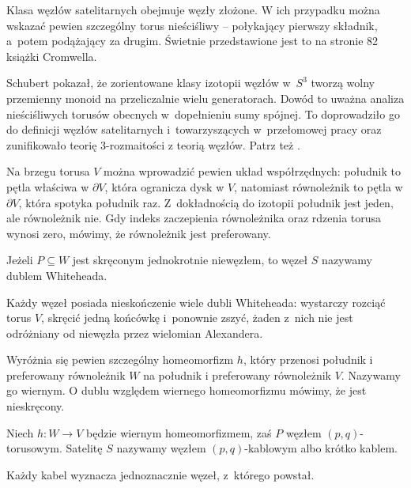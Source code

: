 \begin{example}
	Klasa węzłów satelitarnych obejmuje węzły złożone.
	W ich przypadku można wskazać pewien szczególny torus nieściśliwy -- połykający pierwszy składnik, a~potem podążający za drugim.
	Świetnie przedstawione jest to na stronie 82 książki \cite{cromwell04} Cromwella.
\end{example}

Schubert pokazał, że zorientowane klasy izotopii węzłów w~$S^3$ tworzą wolny przemienny monoid na przeliczalnie wielu generatorach.
Dowód to uważna analiza nieściśliwych torusów obecnych w~dopełnieniu sumy spójnej.
To doprowadziło go do definicji węzłów satelitarnych i~towarzyszących w~przełomowej pracy \cite{schubert53} oraz zunifikowało teorię 3-rozmaitości z teorią węzłów.
Patrz też \cite{motegi97}.

Na brzegu torusa $V$ można wprowadzić pewien układ współrzędnych: południk to pętla właściwa w $\partial V$, która ogranicza dysk w $V$, natomiast równoleżnik to pętla w $\partial V$, która spotyka południk raz.
Z~dokładnością do izotopii południk jest jeden, ale równoleżnik nie.
Gdy indeks zaczepienia równoleżnika oraz rdzenia torusa wynosi zero, mówimy, że równoleżnik jest preferowany.

\begin{definition}
    Jeżeli $P \subseteq W$ jest skręconym jednokrotnie niewęzłem, to węzeł $S$ nazywamy dublem Whiteheada.
\end{definition}

Każdy węzeł posiada nieskończenie wiele dubli Whiteheada: wystarczy rozciąć torus $V$, skręcić jedną końcówkę i~ponownie zszyć, żaden z~nich nie jest odróżniany od niewęzła przez wielomian Alexandera.

Wyróżnia się pewien szczególny homeomorfizm $h$, który przenosi południk i preferowany równoleżnik $W$ na południk i preferowany równoleżnik $V$.
Nazywamy go wiernym.
O dublu względem wiernego homeomorfizmu mówimy, że jest nieskręcony.

\begin{definition}
	Niech $h \colon W \to V$ będzie wiernym homeomorfizmem, zaś $P$ węzłem $(p, q)$-torusowym.
	Satelitę $S$ nazywamy węzłem $(p, q)$-kablowym albo krótko kablem.
\end{definition}

\begin{proposition}
    Każdy kabel wyznacza jednoznacznie węzeł, z~którego powstał.
\end{proposition}

